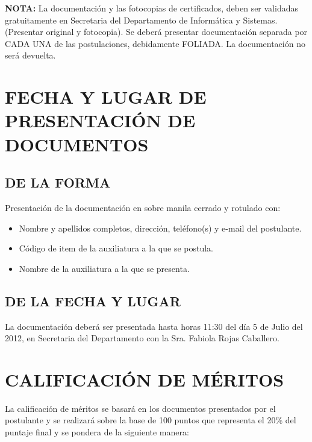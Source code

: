 \documentclass[letterpaper,11pt]{article}
\begin{document}
\textbf{NOTA:} La documentación y las fotocopias de certificados, deben ser validadas gratuitamente en Secretaria del Departamento de Informática y Sistemas. (Presentar original y fotocopia).
Se deberá presentar documentación separada por CADA UNA de las postulaciones, debidamente FOLIADA. La documentación no será devuelta.

\section{FECHA Y LUGAR DE PRESENTACIÓN DE DOCUMENTOS}

\subsection{DE LA FORMA}
Presentación de la documentación en sobre manila cerrado y rotulado con:
\begin{itemize}
\item Nombre y apellidos completos, dirección, teléfono(s) y e-mail del postulante.
\item Código de item de la auxiliatura a la que se postula.
\item Nombre de la auxiliatura a la que se presenta.
\end{itemize}

\subsection{DE LA FECHA Y LUGAR}
La documentación deberá ser presentada hasta horas 11:30 del día 5 de Julio del 2012, en Secretaria del Departamento con la Sra. Fabiola Rojas Caballero.

\section{CALIFICACIÓN DE MÉRITOS}
La calificación de méritos se basará en los documentos presentados por el postulante y se realizará sobre la base de 100 puntos que representa el 20\% del puntaje final y se pondera de la siguiente manera:
\end{document}
